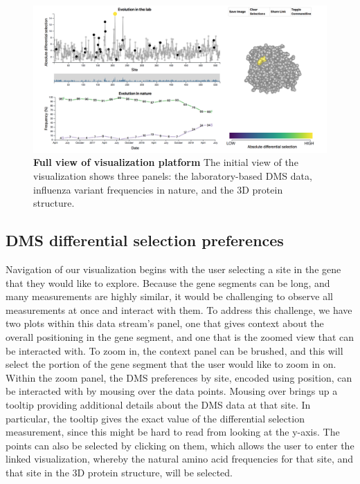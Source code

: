 \documentclass[sigchi]{acmart}
\begin{document}
\begin{figure}[H]
	\includegraphics[width=1.0\textwidth]{viz-overview.png}
	\caption{\textbf{Full view of visualization platform}
   The initial view of the visualization shows three panels: the laboratory-based DMS data, influenza variant frequencies in nature, and the 3D protein structure.
	}
	\label{clade-2-detail}
\end{figure}

\subsection{DMS differential selection preferences}
Navigation of our visualization begins with the user selecting a site in the gene that they would like to explore. Because the gene segments can be long, and many measurements are highly similar, it would be challenging to observe all measurements at once and interact with them. To address this challenge, we have two plots within this data stream’s panel, one that gives context about the overall positioning in the gene segment, and one that is the zoomed view that can be interacted with.  To zoom in, the context panel can be brushed, and this will select the portion of the gene segment that the user would like to zoom in on. Within the zoom panel, the DMS preferences by site, encoded using position, can be interacted with by mousing over the data points. Mousing over brings up a tooltip providing additional details about the DMS data at that site. In particular, the tooltip gives the exact value of the differential selection measurement, since this might be hard to read from looking at the y-axis. The points can also be selected by clicking on them, which allows the user to enter the linked visualization, whereby the natural amino acid frequencies for that site, and that site in the 3D protein structure, will be selected.
\end{document}
